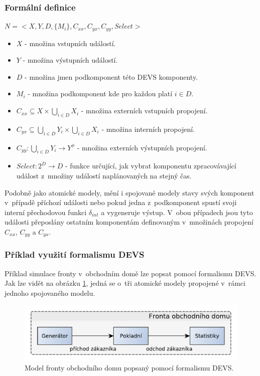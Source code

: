 \subsubsection{Formální definice}

\begin{math}
N=<X,Y,D,\{M_i\},C_{xx}, C_{yx}, C_{yy}, Select>
\end{math}

\begin{itemize}
\item $X$ - množina vstupních událostí.
\item $Y$ - množina výstupních událostí.
\item $D$ - množina jmen podkomponent této DEVS komponenty.
\item $M_i$ - množina podkomponent kde pro každou platí $i \in D$.
\item $C_{xx}\subseteq X \times \bigcup_{i \in D} X_i$ - množina externích vstupních propojení.
\item $C_{yx}\subseteq \bigcup_{i \in D} Y_i \times \bigcup_{i \in D} X_i$ - množina interních propojení.
\item $C_{yy}: \bigcup_{i \in D} Y_i \rightarrow Y^\phi$ - množina externích výstupních propojení.
\item $Select:2^D \rightarrow D$ - funkce určující, jak vybrat komponentu zpracovávající událost z~množiny událostí naplánovaných na stejný čas.
\end{itemize}

Podobně jako atomické modely, mění i spojované modely stavy svých komponent v~případě příchozí události nebo pokud jedna z~podkomponent spustí svoji interní přechodovou funkci $\delta_{int}$ a vygeneruje výstup. V~obou případech jsou tyto události přeposlány ostatním komponentám definovaným v~množinách propojení $C_{xx}$, $C_{yy}$ a $C_{yx}$.

\subsubsection{Příklad využití formalismu DEVS}

Příklad simulace fronty v~obchodním domě lze popsat pomocí formalismu DEVS. Jak lze vidět na obrázku \ref{fig:fronta}, jedná se o~tři atomické modely propojené v~rámci jednoho spojovaného modelu.

\begin{figure}[ht]
\centering
\includegraphics[trim=0cm 0cm 0cm 0cm, scale=0.7]{fig/fronta}
\caption{Model fronty obchodního domu popsaný pomocí formalismu DEVS.}
\label{fig:fronta}
\end{figure}

